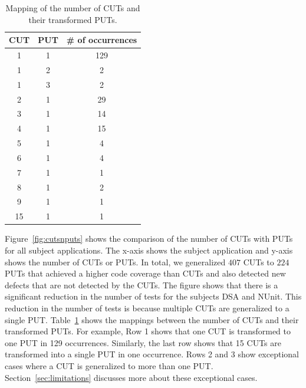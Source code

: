 \begin{table}[t]
\begin{CodeOut}
\begin{center}
\centering \caption {\label{tab:cutputmapping} Mapping of the number of CUTs and their transformed PUTs.}
\begin {tabular} {|c|c|c|}
\hline \textbf{CUT} & \textbf{PUT} & \textbf{\# of occurrences}\\
\hline
\hline 1   & 1   & 129\\
\hline 1   & 2   & 2\\
\hline 1   & 3   & 2\\
\hline 2   & 1   & 29\\
\hline 3   & 1   & 14\\
\hline 4   & 1   & 15\\
\hline 5   & 1   & 4\\
\hline 6   & 1   & 4\\
\hline 7   & 1   & 1\\
\hline 8   & 1   & 2\\
\hline 9   & 1   & 1\\
\hline 15   & 1   & 1\\
\hline
\end{tabular}\vspace*{-3ex}
\end{center}
\end{CodeOut}
\end{table}

Figure~\ref{fig:cutsnputs} shows the comparison of the number of CUTs with PUTs for all subject applications. The x-axis shows the subject application and y-axis shows the number of CUTs or PUTs. In total, we generalized $407$ CUTs to $224$ PUTs that achieved a higher code coverage than CUTs and also detected new defects that are not detected by the CUTs. The figure shows that there is a significant reduction in the number of tests for the subjects DSA and NUnit. This reduction in the number of tests is because multiple CUTs are generalized to a single PUT. Table~\ref{tab:cutputmapping} shows the mappings between the number of CUTs and their transformed PUTs. For example, Row 1 shows that one CUT is transformed to one PUT in 129 occurrences. Similarly, the last row shows that 15 CUTs are transformed into a single PUT in one occurrence. Rows 2 and 3 show exceptional cases where a CUT is generalized to more than one PUT. Section~\ref{sec:limitations} discusses more about these exceptional cases. 

